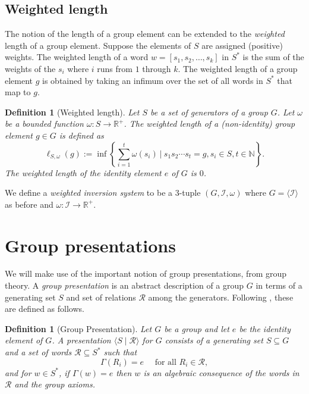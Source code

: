 \documentclass[12pt,a4paper]{amsart}
\newcommand{\invset}{\mathcal{I}}
\newcommand{\id}{e}
\newcommand{\N}{\mathbb N}
\newcommand{\newl}{\ell}
\numberwithin{equation}{section}
\newtheorem{definition}[prop]{Definition}
\begin{document}
\subsection*{Weighted length}
The notion of the length of a group element can be extended to the \emph{weighted} length of a group element. Suppose the elements of $S$ are assigned (positive) weights. The weighted length of a word $w = [s_1, s_2,  \dots ,s_k]$ in $S^*$ is the sum of the weights of the $s_i$ where $i$ runs from $1$ through $k$. The weighted length of a group element $g$ is obtained by taking an infimum over the set of all words in $S^*$ that map to $g$.

\begin{definition}[Weighted length]
\label{def:wwl}
Let $S$ be a set of generators of a group $G$. Let $\omega$ be a bounded function $\omega:S \rightarrow \mathbb{R}^+$. The weighted length of a (non-identity) group element $g \in G$ is defined as 
\[
\newl_{S,\omega}(g):= 
\inf \left\{ \sum_{i=1}^{t}{\omega(s_i)}\ \Big\vert\  s_1 s_2  \cdots s_t = g, s_i \in S,t\in\N\right\}.
\]
The weighted length of the identity element $e$ of $G$ is $0$. 
\end{definition}

We define a \emph{weighted inversion system} to be a 3-tuple $(G, \invset, \omega)$ where $G = \langle \invset \rangle$ as before and $\omega : \invset \rightarrow \mathbb{R}^+$.  

\section{Group presentations}\label{sec:grppresent}

We will make use of the important notion of group presentations, from group theory. A \emph{group presentation} is an abstract description of a group $G$ in terms of a generating set $S$ and set of relations $\mathcal{R}$ among the generators. Following \citet[Chapter 1]{coxeter1980generators}, these are defined as follows.


\begin{definition}[Group Presentation]
Let $G$ be a group and let $\id$ be the identity element of $G$.
A \emph{presentation} $\langle S \mid \mathcal{R} \rangle$ for $G$ consists of a generating set $S \subseteq G$ and a set of words $\mathcal{R} \subseteq S^*$ such that
\[ \Gamma(R_i) = \id \quad \text{ for all } R_i \in \mathcal{R}, \] 
and for $w \in S^*$, if $\Gamma(w)  = \id$ then $w$ is an \emph{algebraic consequence} of the words in $\mathcal{R}$ and the group axioms.
\end{definition}
\end{document}
